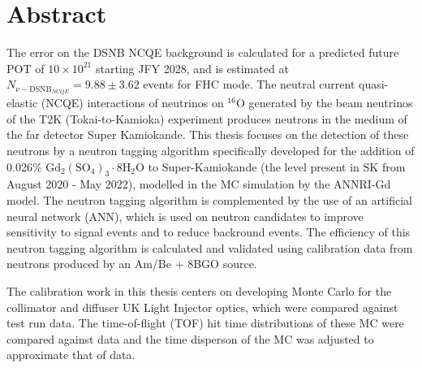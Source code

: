 \chapter*{Abstract}
\thispagestyle{empty}

The error on the DSNB NCQE background is calculated for a predicted future POT of $10 \times 10^{21}$ starting JFY 2028, and is estimated at $N_{\nu-\mathrm{DSNB}_{NCQE}}= 9.88 \pm 3.62$ events for FHC mode. The neutral current quasi-elastic (NCQE) interactions of neutrinos on ${ }^{16} \mathrm{O}$ generated by the beam neutrinos of the T2K (Tokai-to-Kamioka) experiment produces neutrons in the medium of the far detector Super Kamiokande. This thesis focuses on the detection of these neutrons by a neutron tagging algorithm specifically developed for the addition of 0.026\% $\mathrm{Gd}_{2}\left(\mathrm{SO}_{4}\right)_{3} \cdot 8 \mathrm{H}_{2} \mathrm{O}$ to Super-Kamiokande (the level present in SK from August 2020 - May 2022), modelled in the MC simulation by the ANNRI-Gd model. The neutron tagging algorithm is complemented by the use of an artificial neural network (ANN), which is used on neutron candidates to improve sensitivity to signal events and to reduce backround events. The efficiency of this neutron tagging algorithm is calculated and validated using calibration data from neutrons produced by an Am/Be + 8BGO source.

The calibration work in this thesis centers on developing Monte Carlo for the collimator and diffuser UK Light Injector optics, which were compared against test run data. The time-of-flight (TOF) hit time distributions of these MC were compared against data and the time disperson of the MC was adjusted to approximate that of data.